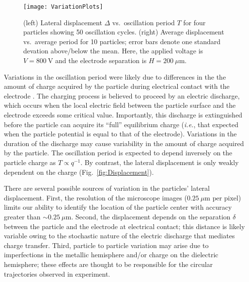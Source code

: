 \begin{appendices}
\begin{figure}[h]
    \centering
    \texttt{[image: VariationPlots]}
    \caption{(left) Lateral displacement $\Delta$ vs.~oscillation period $T$ for four particles showing 50 oscillation cycles. (right) Average displacement vs.~average period for 10 particles; error bars denote one standard devation above/below the mean. Here, the applied voltage is $V=800~\text{V}$ and the electrode separation is $H=200~\mu\text{m}$.}
    \label{fig:Variations}
\end{figure}

Variations in the oscillation period were likely due to differences in the the amount of charge acquired by the particle during electrical contact with the electrode \cite{drews2015contact}.
The charging process is believed to proceed by an electric discharge, which occurs when the local electric field between the particle surface and the electrode exceeds some critical value.
Importantly, this discharge is extinguished before the particle can acquire its ``full'' equilibrium charge (\emph{i.e.}, that expected when the particle potential is equal to that of the electrode).
Variations in the duration of the discharge may cause variability in the amount of charge acquired by the particle.
The oscillation period is expected to depend inversely on the particle charge as $T\propto q^{-1}$.
By contrast, the lateral displacement is only weakly dependent on the charge (Fig.~\ref{fig:Displacement}).

There are several possible sources of variation in the particles' lateral displacement.
First, the resolution of the microscope images ($0.25~\mu\text{m per pixel}$) limits our ability to identify the location of the particle center with accuracy greater than ${\sim}0.25~\mu\text{m}$.
Second, the displacement depends on the separation $\delta$ between the particle and the electrode at electrical contact; this distance is likely variable owing to the stochastic nature of the electric discharge that mediates charge transfer.
Third, particle to particle variation may arise due to imperfections in the metallic hemisphere and/or charge on the dielectric hemisphere; these effects are thought to be responsible for the circular trajectories observed in experiment.

\subsection{}


\end{appendices}
